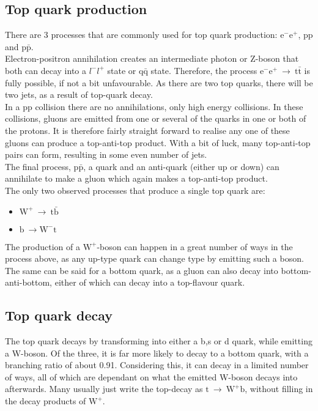 \documentclass[11pt,a4paper]{article}
\begin{document}
\subsection{Top quark production}
There are 3 processes that are commonly used for top quark production: $\text{e}^-\text{e}^+$, $\text{p}\text{p}$ and $\text{p}\bar{\text{p}}$.\\
Electron-positron annihilation creates an intermediate photon or Z-boson that both can decay into a $l^-l^+$ state or $\text{q}\bar{\text{q}}$ state. Therefore, the process $\text{e}^-\text{e}^+ \:\rightarrow\: \text{t}\bar{\text{t}}$ is fully possible, if not a bit unfavourable. As there are two top quarks, there will be two jets, as a result of top-quark decay.\\
In a pp collision there are no annihilations, only high energy collisions. In these collisions, gluons are emitted from one or several of the quarks in one or both of the protons. It is therefore fairly straight forward to realise any one of these gluons can produce a top-anti-top product. With a bit of luck, many top-anti-top pairs can form, resulting in some even number of jets.\\
The final process, $\text{p}\bar{\text{p}}$, a quark and an anti-quark (either up or down) can annihilate to make a gluon which again makes a top-anti-top product.\\
The only two observed processes that produce a single top quark are:

\begin{itemize}
	\item $\text{W}^+\:\rightarrow\:\text{t}\bar{\text{b}}$
	\item $\text{b}\:\rightarrow\text{W}^-\text{t}$
\end{itemize}

The production of a $\text{W}^+$-boson can happen in a great number of ways in the process above, as any up-type quark can change type by emitting such a boson. The same can be said for a bottom quark, as a gluon can also decay into bottom-anti-bottom, either of which can decay into a top-flavour quark.

\subsection{Top quark decay}
The top quark decays by transforming into either a b,s or d quark, while emitting a W-boson. Of the three, it is far more likely to decay to a bottom quark, with a branching ratio of about 0.91. Considering this, it can decay in a limited number of ways, all of which are dependant on what the emitted W-boson decays into afterwards. Many usually just write the top-decay as $\text{t} \:\rightarrow\: \text{W}^+\text{b}$, without filling in the decay products of $\text{W}^+$.\\
\end{document}
